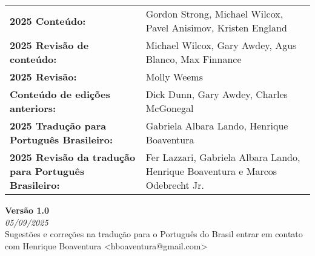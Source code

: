 \begin{titlepage}
        \vspace{0.5cm}

        \begin{tabular}{ p{6.5cm} p{11.5cm} }
            \textbf{2025 Conteúdo:}	& Gordon Strong, Michael Wilcox, Pavel Anisimov, Kristen England \\
            \textbf{2025 Revisão de conteúdo:} & Michael Wilcox, Gary Awdey, Agus Blanco, Max Finnance \\
            \textbf{2025 Revisão:} & Molly Weems \\
            \textbf{Conteúdo de edições anteriors:} & Dick Dunn, Gary Awdey, Charles McGonegal \\
            \textbf{2025 Tradução para Português Brasileiro:} & Gabriela Albara Lando, Henrique Boaventura \\
            \textbf{2025 Revisão da tradução para Português Brasileiro:} & Fer Lazzari, Gabriela Albara Lando, Henrique Boaventura e Marcos Odebrecht Jr. 
        \end{tabular}
        \vspace{0.5cm}
        \textbf{Versão 1.0}\\
        \footnotesize{\textit{05/09/2025}}\\
        \vspace{0.4cm}
        \footnotesize{Sugestões e correções na tradução para o Português do Brasil entrar em contato com Henrique Boaventura <hboaventura@gmail.com>}

\end{titlepage}
